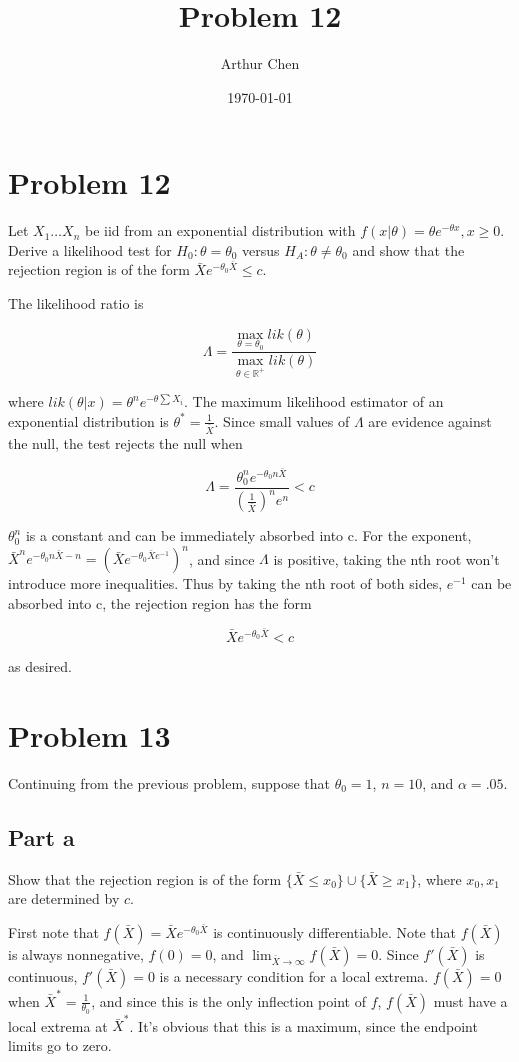 \documentclass{article}
\author{Arthur Chen}
\title{Problem 12}
\date{\today}
\begin{document}
\section*{Problem 12}

Let $X_1 \dots X_n$ be iid from an exponential distribution with $f(x|\theta) = \theta e^{-\theta x}, x \geq 0$. Derive a likelihood test for $H_0: \theta = \theta_0$ versus $H_A: \theta \neq \theta_0$ and show that the rejection region is of the form $\bar{X} e^{-\theta_0 \bar{X}} \leq c$.

The likelihood ratio is

\[
\Lambda = \frac{\max_{\theta = \theta_0} lik(\theta)}
{\max_{\theta \in \mathbb{R^+}} lik(\theta)}
\]

where $lik(\theta|x) = \theta^n e^{-\theta \sum X_i}$. The maximum likelihood estimator of an exponential distribution is $\theta^* = \frac{1}{\bar{X}}$. Since small values of $\Lambda$ are evidence against the null, the test rejects the null when

\[
\Lambda = \frac{\theta_0^n e^{-\theta_0 n \bar{X}}}
{(\frac{1}{\bar{X}})^n e^n} < c
\]

$\theta_0^n$ is a constant and can be immediately absorbed into c. For the exponent, $\bar{X}^n e^{-\theta_0 n \bar{X} - n} = (\bar{X}e^{-\theta_0 \bar{X}e^{-1}})^n$, and since $\Lambda$ is positive, taking the nth root won't introduce more inequalities. Thus by taking the nth root of both sides, $e^{-1}$ can be absorbed into c, the rejection region has the form

\[
\bar{X} e^{-\theta_0 \bar{X}} < c
\]

as desired.

\section*{Problem 13}

Continuing from the previous problem, suppose that $\theta_0 = 1$, $n = 10$, and $\alpha = .05$.

\subsection*{Part a}

Show that the rejection region is of the form $\{\bar{X} \leq x_0\} \cup \{\bar{X} \geq x_1\}$, where $x_0, x_1$ are determined by $c$.

First note that $f(\bar{X}) = \bar{X}e^{-\theta_0 \bar{X}}$ is continuously differentiable. Note that $f(\bar{X})$ is always nonnegative, $f(0) = 0$, and $\lim_{\bar{X} \rightarrow \infty} f(\bar{X}) = 0$. Since $f'(\bar{X})$ is continuous, $f'(\bar{X}) = 0$ is a necessary condition for a local extrema. $f(\bar{X}) = 0$ when $\bar{X}^* = \frac{1}{\theta_0}$, and since this is the only inflection point of $f$, $f(\bar{X})$ must have a local extrema at $\bar{X}^*$. It's obvious that this is a maximum, since the endpoint limits go to zero.
\end{document}
